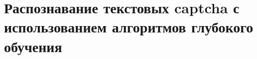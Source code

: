 \section{Распознавание текстовых captcha с использованием алгоритмов глубокого обучения}
\label{sec:section-2}






